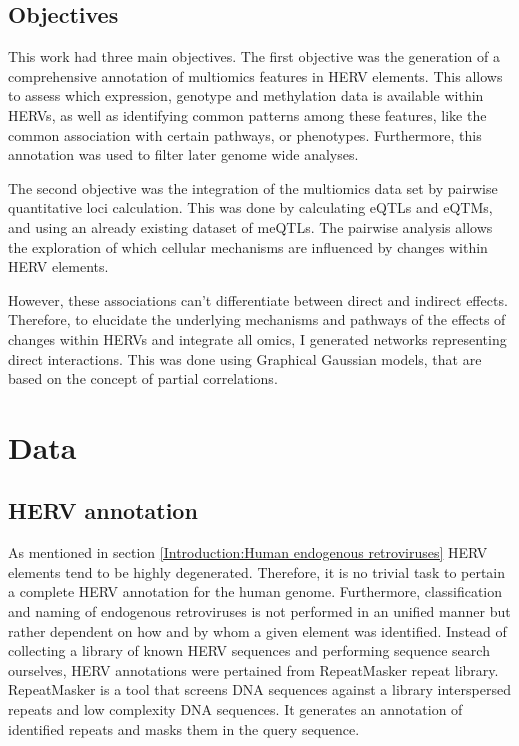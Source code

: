 \documentclass[a4paper,12pt,twoside,openright]{article}
\let\oldsection\section
\def\section{\cleardoublepage\oldsection}
\begin{document}
\subsection{Objectives}
This work had three main objectives. The first objective was the generation of a comprehensive annotation of multiomics features in HERV elements. This allows to assess which expression, genotype and methylation data is available within HERVs, as well as identifying common patterns among these features, like the common association with certain pathways, or phenotypes. Furthermore, this annotation was used to filter later genome wide analyses.

The second objective was the integration of the multiomics data set by pairwise quantitative loci calculation. This was done by calculating eQTLs and eQTMs, and using an already existing dataset of meQTLs. The pairwise analysis allows the exploration of which cellular mechanisms are influenced by changes within HERV elements. 

However, these associations can't differentiate between direct and indirect effects. Therefore, to elucidate the underlying mechanisms and pathways of the effects of changes within HERVs and integrate all omics, I generated networks representing direct interactions. This was done using Graphical Gaussian models, that are based on the concept of partial correlations. 

\newpage
\section{Data}
\label{Data}

\subsection{HERV annotation}
\label{Data:HERV annotation}
As mentioned in section \ref{Introduction:Human endogenous retroviruses} HERV elements tend to be highly degenerated. Therefore, it is no trivial task to pertain a complete HERV annotation for the human genome. Furthermore, classification and naming of endogenous retroviruses is not performed in an unified manner but rather dependent on how and by whom a given element was identified. 
Instead of collecting a library of known HERV sequences and performing sequence search ourselves, HERV annotations were pertained from RepeatMasker\cite{RepeatMasker} repeat library. RepeatMasker is a tool that screens DNA sequences against a library interspersed repeats and low complexity DNA sequences. It generates an annotation of identified repeats and masks them in the query sequence.
\end{document}
